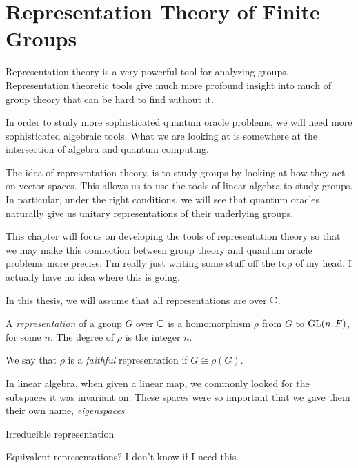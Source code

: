 
\chapter{Representation Theory of Finite Groups}




Representation theory is a very powerful tool for analyzing groups. Representation theoretic tools give much more 
profound insight into much of group theory that can be hard to find without it.



In order to study more sophisticated quantum oracle problems, we will need more sophisticated algebraic tools. What 
we are looking at is somewhere at the intersection of algebra and quantum computing.


The idea of representation theory, is to study groups by looking at how they act on vector spaces. This allows us 
to use the tools of linear algebra to study groups. In particular, under the right conditions, we will see that 
quantum oracles naturally give us unitary representations of their underlying groups.

This chapter will focus on developing the tools of representation theory so that we may make this connection 
between group theory and quantum oracle problems more precise. I'm really just writing some stuff off the top of my 
head, I actually have no idea where this is going. 



In this thesis, we will assume that all representations are over $\mathbb{C} $. 
\begin{definition}
    A \emph{representation} of a group $G$ over $\mathbb{C}$ is a homomorphism $\rho$ from $G$ to $\operatorname{GL}(n,F)$, for some $n$. 
    The degree of $\rho$ is the integer $n$.

    We say that $\rho$ is a \emph{faithful} representation if $G \cong \rho(G)$.
\end{definition}


In linear algebra, when given a linear map, we commonly looked for the subspaces it was invariant on. These spaces 
were so important that we gave them their own name, \emph{eigenspaces} 



\begin{definition}
    Irreducible representation
\end{definition}


\begin{definition}
    Equivalent representations? I don't know if I need this.
\end{definition}


